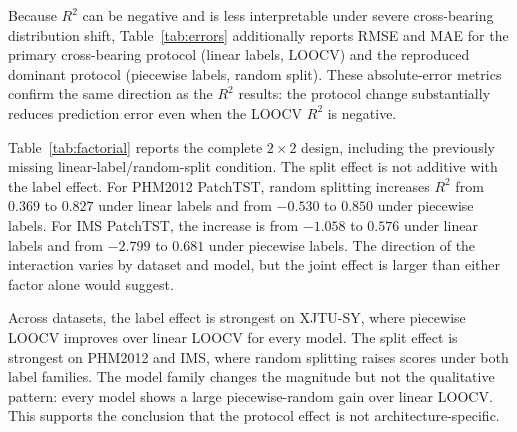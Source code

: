 \documentclass[pdflatex,sn-mathphys-num]{sn-jnl}
\begin{document}
Because $R^2$ can be negative and is less interpretable under severe cross-bearing distribution shift, Table~\ref{tab:errors} additionally reports RMSE and MAE for the primary cross-bearing protocol (linear labels, LOOCV) and the reproduced dominant protocol (piecewise labels, random split). These absolute-error metrics confirm the same direction as the $R^2$ results: the protocol change substantially reduces prediction error even when the LOOCV $R^2$ is negative.

Table~\ref{tab:factorial} reports the complete $2 \times 2$ design, including the previously missing linear-label/random-split condition. The split effect is not additive with the label effect. For PHM2012 PatchTST, random splitting increases $R^2$ from $0.369$ to $0.827$ under linear labels and from $-0.530$ to $0.850$ under piecewise labels. For IMS PatchTST, the increase is from $-1.058$ to $0.576$ under linear labels and from $-2.799$ to $0.681$ under piecewise labels. The direction of the interaction varies by dataset and model, but the joint effect is larger than either factor alone would suggest.

Across datasets, the label effect is strongest on XJTU-SY, where piecewise LOOCV improves over linear LOOCV for every model. The split effect is strongest on PHM2012 and IMS, where random splitting raises scores under both label families. The model family changes the magnitude but not the qualitative pattern: every model shows a large piecewise-random gain over linear LOOCV. This supports the conclusion that the protocol effect is not architecture-specific.
\end{document}
